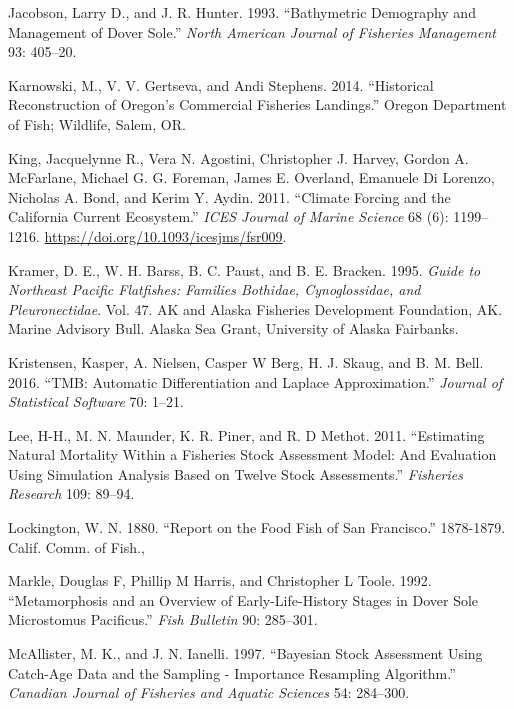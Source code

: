 \documentclass[11pt,
  english,
  a4paper,
]{article}
\begin{document}
\begin{cslreferences}
\leavevmode\hypertarget{ref-jacobson_bathymetric_1993}{}%
Jacobson, Larry D., and J. R. Hunter. 1993. ``Bathymetric Demography and Management of Dover Sole.'' \emph{North American Journal of Fisheries Management} 93: 405--20.

\leavevmode\hypertarget{ref-karnowski_historical_2014}{}%
Karnowski, M., V. V. Gertseva, and Andi Stephens. 2014. ``Historical Reconstruction of Oregon's Commercial Fisheries Landings.'' Oregon Department of Fish; Wildlife, Salem, OR.

\leavevmode\hypertarget{ref-king_climate_2011}{}%
King, Jacquelynne R., Vera N. Agostini, Christopher J. Harvey, Gordon A. McFarlane, Michael G. G. Foreman, James E. Overland, Emanuele Di Lorenzo, Nicholas A. Bond, and Kerim Y. Aydin. 2011. ``Climate Forcing and the California Current Ecosystem.'' \emph{ICES Journal of Marine Science} 68 (6): 1199--1216. \url{https://doi.org/10.1093/icesjms/fsr009}.

\leavevmode\hypertarget{ref-kramer_guide_1995}{}%
Kramer, D. E., W. H. Barss, B. C. Paust, and B. E. Bracken. 1995. \emph{Guide to Northeast Pacific Flatfishes: Families Bothidae, Cynoglossidae, and Pleuronectidae}. Vol. 47. AK and Alaska Fisheries Development Foundation, AK. Marine Advisory Bull. Alaska Sea Grant, University of Alaska Fairbanks.

\leavevmode\hypertarget{ref-kristensen_tmb:_2016}{}%
Kristensen, Kasper, A. Nielsen, Casper W Berg, H. J. Skaug, and B. M. Bell. 2016. ``TMB: Automatic Differentiation and Laplace Approximation.'' \emph{Journal of Statistical Software} 70: 1--21.

\leavevmode\hypertarget{ref-Lee_est_m_2011}{}%
Lee, H-H., M. N. Maunder, K. R. Piner, and R. D Methot. 2011. ``Estimating Natural Mortality Within a Fisheries Stock Assessment Model: And Evaluation Using Simulation Analysis Based on Twelve Stock Assessments.'' \emph{Fisheries Research} 109: 89--94.

\leavevmode\hypertarget{ref-lockington_report_1880}{}%
Lockington, W. N. 1880. ``Report on the Food Fish of San Francisco.'' 1878-1879. Calif. Comm. of Fish.,

\leavevmode\hypertarget{ref-markle_metamorphosis_1992}{}%
Markle, Douglas F, Phillip M Harris, and Christopher L Toole. 1992. ``Metamorphosis and an Overview of Early-Life-History Stages in Dover Sole Microstomus Pacificus.'' \emph{Fish Bulletin} 90: 285--301.

\leavevmode\hypertarget{ref-mcallister_bayesian_1997}{}%
McAllister, M. K., and J. N. Ianelli. 1997. ``Bayesian Stock Assessment Using Catch-Age Data and the Sampling - Importance Resampling Algorithm.'' \emph{Canadian Journal of Fisheries and Aquatic Sciences} 54: 284--300.


\end{cslreferences}
\end{document}
